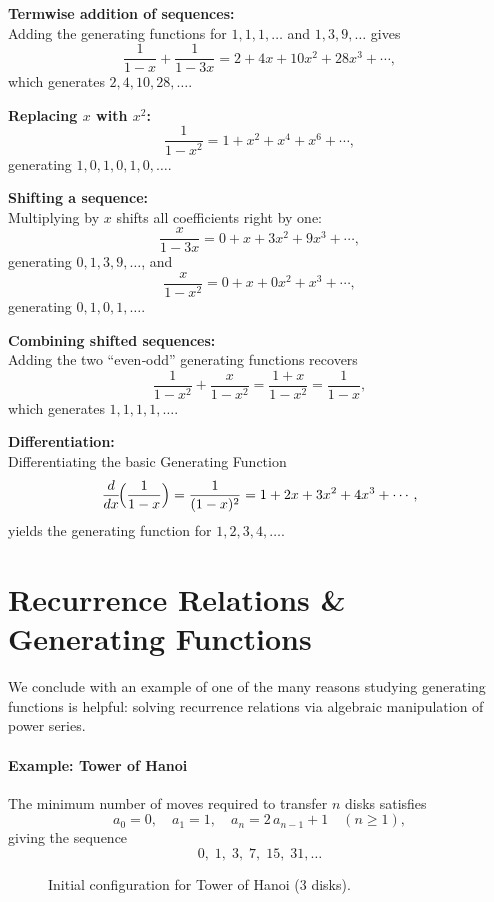 \documentclass[docmute]{article}
\begin{document}
\medskip
\noindent
\textbf{Termwise addition of sequences:}\\
Adding the generating functions for \(1,1,1,\dots\) and \(1,3,9,\dots\) gives
\[
\frac{1}{1-x} + \frac{1}{1-3x}
= 2 + 4x + 10x^2 + 28x^3 + \cdots,
\]
which generates \(2,4,10,28,\dots\).

\medskip
\noindent
\textbf{Replacing \(x\) with \(x^2\):}
\[
\frac{1}{1-x^2} = 1 + x^2 + x^4 + x^6 + \cdots,
\]
generating \(1,0,1,0,1,0,\dots\).

\medskip
\noindent
\textbf{Shifting a sequence:}\\
Multiplying by \(x\) shifts all coefficients right by one:
\[
\frac{x}{1-3x} = 0 + x + 3x^2 + 9x^3 + \cdots,
\]
generating \(0,1,3,9,\dots\), and
\[
\frac{x}{1-x^2} = 0 + x + 0x^2 + x^3 + \cdots,
\]
generating \(0,1,0,1,\dots\).

\medskip
\noindent
\textbf{Combining shifted sequences:}\\
Adding the two “even‑odd” generating functions recovers
\[
\frac{1}{1-x^2} + \frac{x}{1-x^2} = \frac{1+x}{1-x^2} = \frac{1}{1-x},
\]
which generates \(1,1,1,1,\dots\).

\medskip
\noindent
\textbf{Differentiation:}\\
Differentiating the basic Generating Function
\[
\frac{d}{dx}\!\Bigl(\frac{1}{1-x}\Bigr)
= \frac{1}{(1-x)^2}
= 1 + 2x + 3x^2 + 4x^3 + \cdots,
\]
yields the generating function for \(1,2,3,4,\dots\).


\medskip

\FloatBarrier            %

\section{Recurrence Relations \& Generating Functions}

We conclude with an example of one of the many reasons studying generating functions is helpful: solving recurrence relations via algebraic manipulation of power series.

\paragraph{Example: Tower of Hanoi}  
The minimum number of moves required to transfer \(n\) disks satisfies
\[
a_0 = 0,\quad
a_1 = 1,\quad
a_n = 2\,a_{n-1} + 1 \quad(n\ge1),
\]
giving the sequence
\[
0,\;1,\;3,\;7,\;15,\;31,\dots
\]

\begin{figure}[ht]
  \centering
  \caption{Initial configuration for Tower of Hanoi (3 disks).}
\end{figure}
\end{document}
